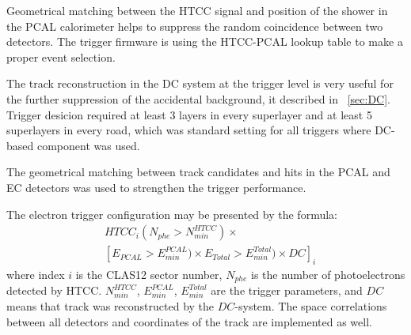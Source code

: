 Geometrical matching between the HTCC signal and position of the shower in the PCAL calorimeter helps to suppress the
random coincidence between two detectors. The trigger firmware is using the HTCC-PCAL lookup table to make a proper event selection.   

The track reconstruction in the DC system at the trigger level is very useful for the further suppression of the accidental background, it described in ~\ref{sec:DC}. Trigger desicion required at least 3 layers in every superlayer and at least 5 superlayers in every road, which was standard setting for all triggers where DC-based component was used.

The geometrical matching between track candidates and hits in the PCAL and EC detectors was used to strengthen the trigger performance.

The electron trigger configuration may be presented by the formula:
\begin{align*} 
 &HTCC_i(N_{phe}{>}N^{HTCC}_{min})\times\\
 & [E_{PCAL}{>}E^{PCAL}_{min})\times E_{Total}{>}E^{Total}_{min})\times  DC]_i
\end{align*}
\noindent
where index $i$ is the CLAS12 sector number, $N_{phe}$ is the number of photoelectrons detected by HTCC.  $N^{HTCC}_{min}$, 
$E^{PCAL}_{min}$, $ E^{Total}_{min}$ are the trigger parameters, and $DC$ means that  track was reconstructed by the $DC$-system. The space correlations between all detectors and coordinates of the track are implemented as well.


